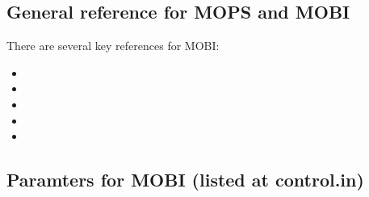 \documentclass[a4paper]{article}
\def\noin{\noindent }
\begin{document}
\subsection{General reference for MOPS and MOBI}

\noin There are several key references for MOBI:
\begin{itemize}
\item {}
\item {}
\item {}
\item {}
\item {}
\end{itemize}

\subsection{Paramters for MOBI (listed at control.in)} \label{subsection:mobi_params}
\end{document}
